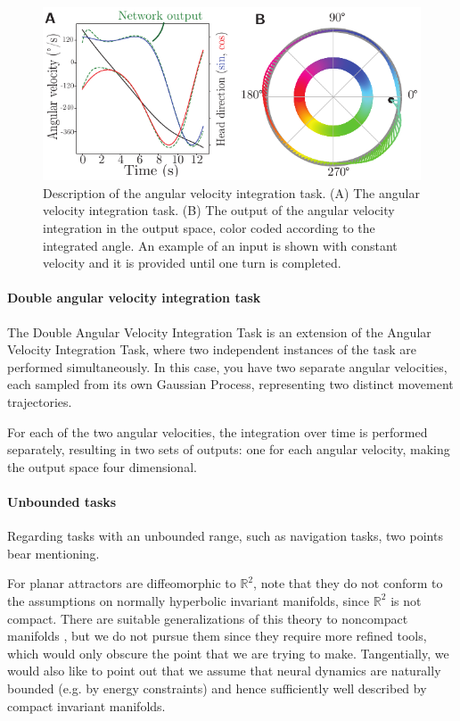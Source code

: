 \documentclass{article} %
\newcounter{ct}
\newcommand{\reals}{\mathbb{R}}
\theoremstyle{definition}
\theoremstyle{remark}
\begin{document}
 \begin{figure}[tbhp]
     \centering
    \includegraphics[width=\textwidth]{task_fig}
       \caption{Description of the angular velocity integration task.
        (A) The angular velocity integration task.
        (B) The output of the angular velocity integration in the output space, color coded according to the integrated angle. An example of an input is shown with constant velocity and it is provided until one turn is completed.
        }\label{fig:angular_task}
\end{figure}

\paragraph{Double angular velocity integration task}
The Double Angular Velocity Integration Task is an extension of the Angular Velocity Integration Task, where two independent instances of the task are performed simultaneously. In this case, you have two separate angular velocities, each sampled from its own Gaussian Process, representing two distinct movement trajectories.

For each of the two angular velocities, the integration over time is performed separately, resulting in two sets of outputs: one for each angular velocity, making the output space four dimensional.

\paragraph{Unbounded tasks}
Regarding tasks with an unbounded range, such as navigation tasks, two points bear mentioning.

For planar attractors are diffeomorphic to $\reals^2$, note that they do not conform to the assumptions on normally hyperbolic invariant manifolds, since $\reals^2$ is not compact.
There are suitable generalizations of this theory to noncompact manifolds \citep{eldering2013normally}, but we do not pursue them since they require more refined tools, which would only obscure the point that we are trying to make.
Tangentially, we would also like to point out that we assume that neural dynamics are naturally bounded (e.g. by energy constraints) and hence sufficiently well described by compact invariant manifolds.
\end{document}

